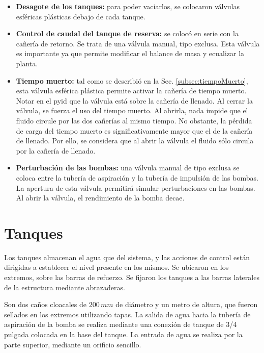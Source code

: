 \begin{itemize}
  \item \textbf{Desagote de los tanques:}
  para poder vaciarlos, se colocaron válvulas esféricas plásticas debajo de
cada tanque.

  \item \textbf{Control de caudal del tanque de reserva:} se colocó en serie
con la cañería de retorno. Se trata de una válvula manual, tipo exclusa.
  Esta válvula es importante ya que permite modificar el balance de masa y
ecualizar la planta.

  \item \textbf{Tiempo muerto:}
  tal como se describió en la Sec. \ref{subsec:tiempoMuerto}, esta válvula
esférica plástica permite activar la cañería de tiempo muerto.
  Notar en el \gls{pyid} que la válvula está sobre la cañería de llenado.
  Al cerrar la válvula, se fuerza el uso del tiempo muerto.
  Al abrirla, nada impide que el fluido circule por las dos cañerías al mismo
tiempo.
  No obstante, la pérdida de carga del tiempo muerto es significativamente
mayor que el de la cañería de llenado.
  Por ello, se considera que al abrir la válvula  el fluido sólo circula
por la cañería de llenado.

  \item \textbf{Perturbación de las bombas:}
  una válvula manual de tipo exclusa se coloca entre la tubería de aspiración y
la tubería de impulsión de las bombas.
  La apertura de esta válvula permitirá simular perturbaciones en las
bombas.
 Al abrir la válvula, el rendimiento de la bomba decae.
 \end{itemize}

\section{Tanques}
\label{sec:Tanques}

Los tanques almacenan el agua que del sistema, y las acciones de
control están dirigidas a establecer el nivel presente en los mismos.
Se ubicaron en los extremos, sobre las barras de refuerzo.
Se fijaron los tanques a las barras laterales de la estructura mediante
abrazaderas.

Son dos caños cloacales de $200\,mm$ de diámetro y un metro de altura, que
fueron
sellados en los extremos utilizando tapas.
La salida de agua hacia la tubería de aspiración de la bomba se realiza
mediante una conexión de tanque de 3/4 pulgada colocada en la base del tanque.
La entrada de agua se realiza por la parte superior, mediante un orificio
sencillo.

